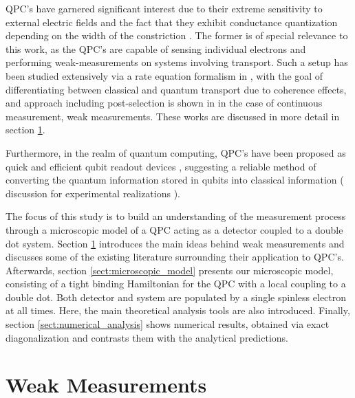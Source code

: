 \documentclass{article}
\newcommand\sj[1]{ {\color{orange} #1} }
\begin{document}
QPC's have garnered significant interest due to their extreme sensitivity to external electric 
fields \cite{fieldMeasurementsCoulombBlockade1993} and the fact that
they exhibit conductance quantization depending on the width of the constriction \cite{wharamTransportQuantisation1988,
vanweesQuantizedConductancePoint1988,
tekmanTheoreticalStudyTransport1991}. The former is of special relevance to this work, as the QPC's are capable of 
sensing individual electrons and performing weak-measurements on systems involving transport. Such a setup has been studied extensively via
a rate equation formalism in \cite{gurvitzMicroscopicDerivationRate1996a,gurvitzNoninvasiveDetector1997a}, with the 
goal of differentiating between classical and quantum transport due to coherence effects, and approach including 
post-selection is shown in \cite{korotkovSelectiveQuantumEvolution2001} in the case of continuous
measurement, weak measurements. These works are discussed in more detail in section \ref{sect:weak_measurements}. 

Furthermore, in the realm of quantum computing, 
QPC's have been proposed as quick and efficient qubit readout devices \cite{engelMeasurementEfficiency2004},
suggesting a reliable method of converting the quantum information stored in qubits into classical information  
(\sj{discussion for experimental realizations}). 

The focus of this study is to build an understanding of the measurement process through a microscopic model of a QPC 
acting as a detector coupled to a double dot system. Section \ref{sect:weak_measurements} introduces the main ideas behind
weak measurements and discusses some of the existing literature surrounding their application to QPC's. Afterwards, 
section \ref{sect:microscopic_model} presents our microscopic model, consisting of a tight binding Hamiltonian for the 
QPC with a local coupling to a double dot. Both detector and system are populated by a single spinless electron at all 
times. 
Here, the main theoretical analysis tools are also introduced. 
Finally, section \ref{sect:numerical_analysis} shows numerical 
results, obtained via exact diagonalization and contrasts them with the analytical predictions.

\section{Weak Measurements}\label{sect:weak_measurements}
\end{document}
